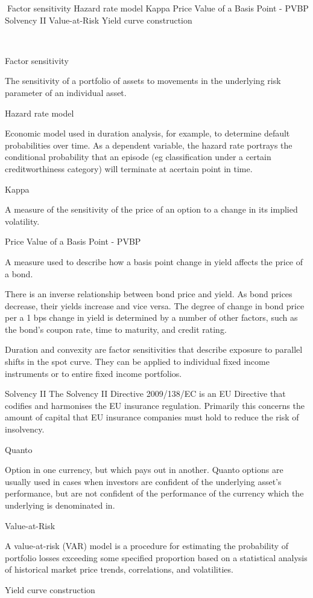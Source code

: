


Factor sensitivity
Hazard rate model
Kappa
Price Value of a Basis Point - PVBP
Solvency II
Value-at-Risk
Yield curve construction



Factor sensitivity

The sensitivity of a portfolio of assets to movements in the underlying risk parameter of an individual asset.


  

Hazard rate model

Economic model used in duration analysis, for example, to determine default probabilities over time. As a dependent variable, the hazard rate portrays the conditional probability that an episode (eg classification under a certain creditworthiness category) will terminate at acertain point in time.


Kappa

A measure of the sensitivity of the price of an option to a change in its implied volatility.


Price Value of a Basis Point - PVBP 
 
A measure used to describe how a basis point change in yield affects the price of a bond.

There is an inverse relationship between bond price and yield. As bond prices decrease, their yields increase and vice versa. The degree of change in bond price per a 1 bps change in yield is determined by a number of other factors, such as the bond's coupon rate, time to maturity, and credit rating.


Duration and convexity are factor sensitivities that describe exposure to parallel shifts in the spot curve. They can be applied to individual fixed income instruments or to entire fixed income portfolios.


Solvency II
The Solvency II Directive 2009/138/EC is an EU Directive that codifies and harmonises the EU insurance regulation. Primarily this concerns the amount of capital that EU insurance companies must hold to reduce the risk of insolvency.

Quanto


Option in one currency, but which pays out in another. Quanto options are usually used in cases when investors are confident of the underlying asset's performance, but are not confident of the performance of the currency which the underlying is denominated in. 


Value-at-Risk 

A value-at-risk (VAR) model is a procedure for estimating the probability of portfolio losses exceeding some specified proportion based on a statistical analysis of historical market price trends, correlations, and volatilities.    
  
Yield curve construction


